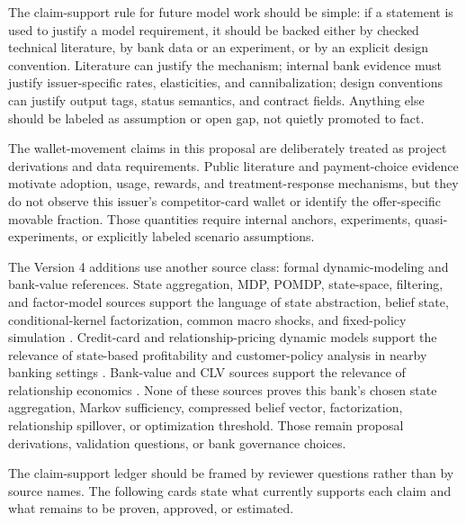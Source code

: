 \documentclass[11pt]{article}
\newcommand{\1}{\mathbf{1}}
\begin{document}
The claim-support rule for future model work should be simple: if a statement
is used to justify a model requirement, it should be backed either by checked
technical literature, by bank data or an experiment, or by an explicit design
convention. Literature can justify the mechanism; internal bank evidence must
justify issuer-specific rates, elasticities, and cannibalization; design
conventions can justify output tags, status semantics, and contract fields.
Anything else should be labeled as assumption or open gap, not quietly promoted
to fact.

The wallet-movement claims in this proposal are deliberately treated as project
derivations and data requirements. Public literature and payment-choice
evidence motivate adoption, usage, rewards, and treatment-response mechanisms,
but they do not observe this issuer's competitor-card wallet or identify the
offer-specific movable fraction. Those quantities require internal anchors,
experiments, quasi-experiments, or explicitly labeled scenario assumptions.

The Version 4 additions use another source class: formal dynamic-modeling and
bank-value references. State aggregation, MDP, POMDP, state-space, filtering,
and factor-model sources support the language of state abstraction, belief
state, conditional-kernel factorization, common macro shocks, and fixed-policy
simulation \citep{bean1987aggregation,puterman1994mdp,smallwood1973pomdp,
kaelbling1998pomdp,durbinkoopman2012ssm,westharrison1997bfdm,doucet2001smc,
ledoux2005recursivefilters,bernankeboivin2003datarich,
bernankeboivineliasz2005favar,stockwatson2005factorvar}. Credit-card and
relationship-pricing dynamic models support the relevance of state-based
profitability and customer-policy analysis in nearby banking settings
\citep{thomas2011creditcardmdp,lewis2005relationshippricing}. Bank-value and
CLV sources support the relevance of relationship economics
\citep{egan2022bankvalue,berger1998clv,rust2004return,venkatesan2004clv}.
None of these sources proves this bank's chosen state aggregation, Markov
sufficiency, compressed belief vector, factorization, relationship spillover,
or optimization threshold. Those remain proposal derivations, validation
questions, or bank governance choices.

The claim-support ledger should be framed by reviewer questions rather than by
source names. The following cards state what currently supports each claim and
what remains to be proven, approved, or estimated.
\end{document}
